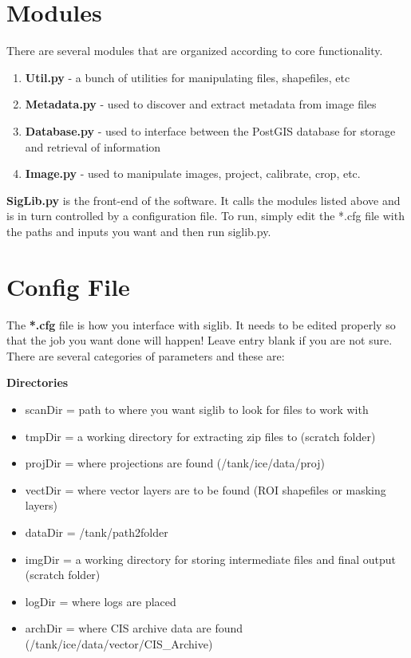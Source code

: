 \documentclass[letterpaper,10pt,english]{sphinxmanual}
\begin{document}
\section{Modules}
\label{project:modules}
There are several modules that are organized according to core
functionality.
\begin{enumerate}
\item {} 
\textbf{Util.py} - a bunch of utilities for manipulating files,
shapefiles, etc

\item {} 
\textbf{Metadata.py} - used to discover and extract metadata from image
files

\item {} 
\textbf{Database.py} - used to interface between the PostGIS database for
storage and retrieval of information

\item {} 
\textbf{Image.py} - used to manipulate images, project, calibrate, crop,
etc.

\end{enumerate}

\textbf{SigLib.py} is the front-end of the software. It calls the modules
listed above and is in turn controlled by a configuration file. To run,
simply edit the *.cfg file with the paths and inputs you want and then
run siglib.py.


\section{Config File}
\label{project:config-file}
The \textbf{*.cfg} file is how you interface with siglib. It needs to be
edited properly so that the job you want done will happen! Leave entry
blank if you are not sure. There are several categories of parameters
and these are:

\textbf{Directories}
\begin{itemize}
\item {} 
scanDir = path to where you want siglib to look for files to work
with

\item {} 
tmpDir = a working directory for extracting zip files to (scratch
folder)

\item {} 
projDir = where projections are found (/tank/ice/data/proj)

\item {} 
vectDir = where vector layers are to be found (ROI shapefiles or
masking layers)

\item {} 
dataDir = /tank/path2folder

\item {} 
imgDir = a working directory for storing intermediate files and final
output (scratch folder)

\item {} 
logDir = where logs are placed

\item {} 
archDir = where CIS archive data are found
(/tank/ice/data/vector/CIS\_Archive)

\end{itemize}
\end{document}
